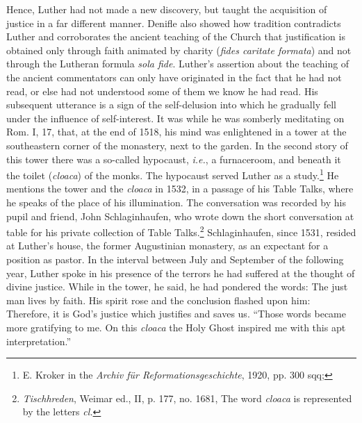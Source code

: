 Hence, Luther had not made a new discovery,
but taught the acquisition of justice in a far different manner. Denifle
also showed how tradition contradicts Luther and corroborates the
ancient teaching of the Church that justification is obtained only
through faith animated by charity (\textit{fides caritate formata}) and not
through the Lutheran formula \textit{sola fide}. Luther’s assertion about the
teaching of the ancient commentators can only have originated in the
fact that he had not read, or else had not understood some of them we
know he had read. His subsequent utterance is a sign of the self-delusion
into which he gradually fell under the influence of self-interest.
It was while he was somberly meditating on Rom. I, 17, that, at
the end of 1518, his mind was enlightened in a tower at the southeastern
corner of the monastery, next to the garden. In the second
story of this tower there was a so-called hypocaust, \textit{i.e.}, a furnaceroom,
and beneath it the toilet (\textit{cloaca}) of the monks. The hypocaust
served Luther as a study.\footnote{E. Kroker in the \textit{Archiv für Reformationsgeschichte}, 1920, pp. 300 sqq;}
He mentions the tower and the
\textit{cloaca} in 1532, in a passage of his Table Talks, where he speaks of
the place of his illumination. The conversation was recorded by
his pupil and friend, John Schlaginhaufen, who wrote down the short
conversation at table for his private collection of Table Talks.\footnote
{\textit{Tischhreden}, Weimar ed., II, p. 177, no. 1681, The word \textit{cloaca} is represented
by the letters \textit{cl.}}
Schlaginhaufen, since 1531, resided at Luther’s house, the former
Augustinian monastery, as an expectant for a position as pastor. In
the interval between July and September of the following year, Luther spoke
in his presence of the terrors he had suffered at the thought
of divine justice. While in the tower, he said, he had pondered the
words: The just man lives by faith. His spirit rose and the conclusion
flashed upon him: Therefore, it is God’s justice which justifies and
saves us. “Those words became more gratifying to me. On this \textit{cloaca}
the Holy Ghost inspired me with this apt interpretation.”


